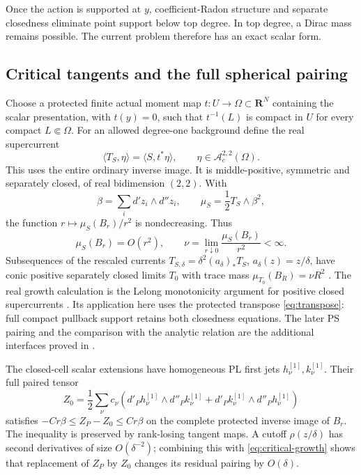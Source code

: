 \documentclass[11pt,a4paper]{article}
\newcommand{\MathEqref}[1]{{\hypersetup{linkcolor=EquationLink}\eqref{#1}}}
\theoremstyle{definition}
\theoremstyle{remark}
\numberwithin{equation}{section}
\newcommand{\R}{\mathbf R}
\begin{document}
Once the action is supported at $y$, coefficient-Radon structure and
separate closedness eliminate point support below top degree.  In top
degree, a Dirac mass remains possible.  The current problem therefore
has an exact scalar form.

\subsection{Critical tangents and the full spherical pairing}

Choose a protected finite actual moment map
$t:U\to\Omega\subset\R^N$ containing the scalar presentation, with
$t(y)=0$, such that $t^{-1}(L)$ is compact in $U$ for every compact
$L\Subset\Omega$.  For an allowed degree-one background define the
real supercurrent
\begin{equation}
                  \langle T_S,\eta\rangle
                       =\langle S,t^*\eta\rangle,
            \qquad \eta\in\mathcal A_c^{2,2}(\Omega).
                         \label{eq:transpose}
\end{equation}
This uses the entire ordinary inverse image.  It is middle-positive,
symmetric and separately closed, of real bidimension $(2,2)$.
With
\[
        \beta=\sum_i d'z_i\wedge d''z_i,\qquad
        \mu_S=\frac12T_S\wedge\beta^2,
\]
the function $r\mapsto\mu_S(B_r)/r^2$ is nondecreasing.  Thus
\begin{equation}
 \mu_S(B_r)=O(r^2),\qquad
 \nu=\lim_{r\downarrow0}\frac{\mu_S(B_r)}{r^2}<\infty.
                         \label{eq:critical-growth}
\end{equation}
Subsequences of the rescaled currents
$T_{S,\delta}=\delta^2(a_\delta)_*T_S$,
$a_\delta(z)=z/\delta$, have conic positive separately closed limits
$T_0$ with trace mass $\mu_{T_0}(B_R)=\nu R^2$ \cite{I13}.
The real growth calculation is the Lelong monotonicity argument for
positive closed supercurrents \cite[Proposition~3.4 and
Corollary~3.5]{Lagerberg}.  Its application here uses the protected
transpose \MathEqref{eq:transpose}: full compact pullback support
retains both closedness equations.  The later PS pairing and the
comparison with the analytic relation are the additional interfaces
proved in \cite{I13}.

The closed-cell scalar extensions have homogeneous PL first jets
$h_\nu^{[1]},k_\nu^{[1]}$.  Their full paired tensor
\begin{equation}
 Z_0=\frac12\sum_\nu c_\nu
 (d'_Ph_\nu^{[1]}\wedge d''_Pk_\nu^{[1]}
       +d'_Pk_\nu^{[1]}\wedge d''_Ph_\nu^{[1]})
                         \label{eq:leading-tensor}
\end{equation}
satisfies $-Cr\beta\le Z_P-Z_0\le Cr\beta$ on the complete protected
inverse image of $B_r$.  The inequality is preserved by rank-losing
tangent maps.  A cutoff $\rho(z/\delta)$ has second derivatives of
size $O(\delta^{-2})$; combining this with
\MathEqref{eq:critical-growth} shows that replacement of $Z_P$ by
$Z_0$ changes its residual pairing by $O(\delta)$.
\end{document}
